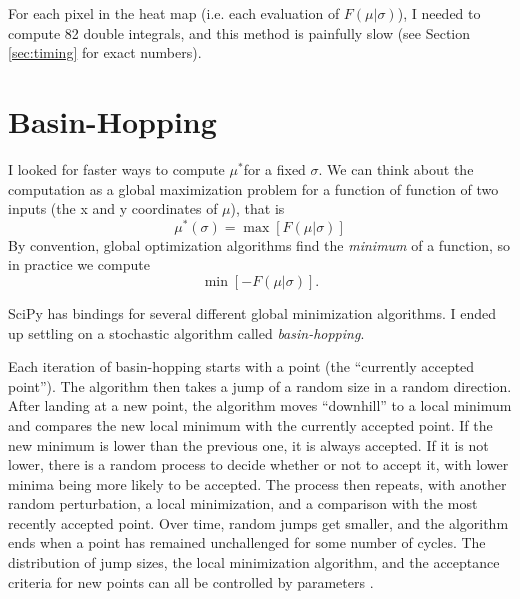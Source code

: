 \documentclass[]{article}
\newcommand{\mustar}{\ensuremath{\mu^* }}
\newcommand{\fmusig}{\ensuremath{F(\mu \vert \sigma)}}
\begin{document}
For each pixel in the heat map (i.e. each evaluation of \fmusig), I needed to compute 82 double integrals, and this method is painfully slow (see Section \ref{sec:timing} for exact numbers).


\section{Basin-Hopping}

I looked for faster ways to compute  \mustar for a fixed $\sigma$. We can think about the computation as a global maximization problem for a function of function of two inputs (the x and y coordinates of $\mu$), that is
\begin{equation}
	\mu^*(\sigma) = \max [F(\mu \vert \sigma)]
\end{equation}
By convention, global optimization algorithms find the \textit{minimum} of a function, so in practice we compute 
\begin{equation}
	\min[-F(\mu \vert \sigma)].
\end{equation}

SciPy has bindings for several different global minimization algorithms. I ended up settling on a stochastic algorithm called \textit{basin-hopping}. 

Each iteration of basin-hopping starts with a point (the ``currently accepted point''). The algorithm then takes a jump of a random size in a random direction. After landing at  a new point, the algorithm  moves ``downhill'' to a local minimum and compares the new local minimum with the currently accepted point. If the new minimum is lower than the previous one, it is always accepted. If it is not lower, there is a random process to decide whether or not to accept it, with lower minima being more likely to be accepted. The process then repeats, with another random perturbation, a local minimization, and a comparison with the most recently accepted point. Over time, random jumps get smaller, and the algorithm ends when a point has remained unchallenged for some number of cycles. The distribution of jump sizes, the local minimization algorithm, and the acceptance criteria for new points can all be controlled by parameters \cite{basin}. 
\end{document}
